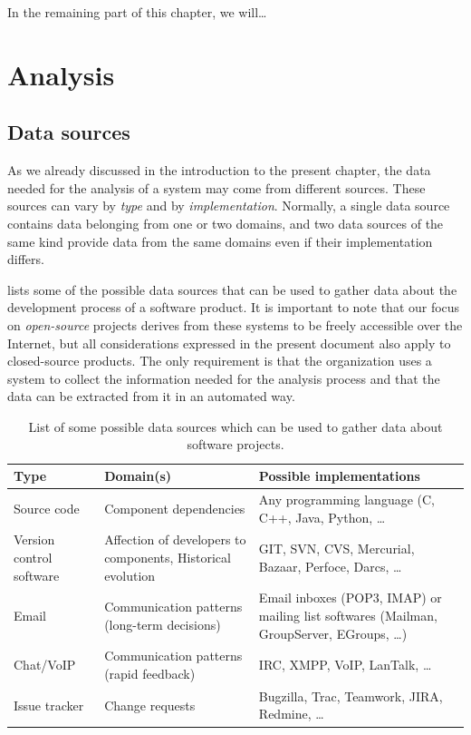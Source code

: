 In the remaining part of this chapter, we will\ldots\\



\section{Analysis}
\label{sec:acquisition/analysis}

\subsection{Data sources}
\label{sec:acquisition/analysis/sources}

As we already discussed in the introduction to the present chapter, the data needed for the analysis of a system may come from different sources. These sources can vary by \emph{type} and by \emph{implementation}. Normally, a single data source contains data belonging from one or two domains, and two data sources of the same kind provide data from the same domains even if their implementation differs.

 lists some of the possible data sources that can be used to gather data about the development process of a software product. It is important to note that our focus on \emph{open-source} projects derives from these systems to be freely accessible over the Internet, but all considerations expressed in the present document also apply to closed-source products. The only requirement is that the organization uses a system to collect the information needed for the analysis process and that the data can be extracted from it in an automated way.

\begin{table}
  \begin{tabularx}{\textwidth}{ p{2.3cm} | X | X }
    \toprule
    Type & Domain(s) & Possible implementations\\[.7mm]
    \hline

    Source code & Component dependencies & Any programming language (C, C++, Java, Python, \ldots \\[3mm]
    Version control software & Affection of developers to components, Historical evolution & GIT, SVN, CVS, Mercurial, Bazaar, Perfoce, Darcs, \ldots \\[3mm]
    Email & Communication patterns (long-term decisions) & Email inboxes (POP3, IMAP) or mailing list softwares (Mailman, GroupServer, EGroups, \ldots) \\[3mm]
    Chat/VoIP & Communication patterns (rapid feedback) & IRC, XMPP, VoIP, LanTalk, \ldots \\[3mm]
    Issue tracker & Change requests & Bugzilla, Trac, Teamwork, JIRA, Redmine, \ldots \\

    \bottomrule
  \end{tabularx}

  \caption[Possible data source types, domains and implementations]{List of some possible data sources which can be used to gather data about software projects.}
  \label{tab:sources}
\end{table}

